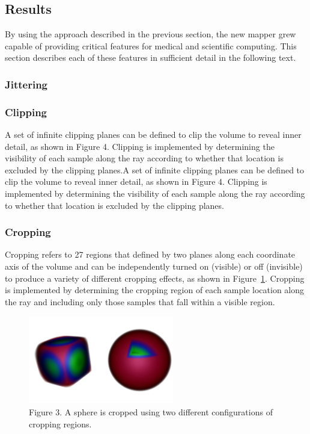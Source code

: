 \subsection{Results}
By using the approach described in the previous section, the new mapper grew capable of providing critical features for medical and scientific computing. This section describes each of these features in sufficient detail in the following text.

\subsubsection{Jittering}

\subsubsection{Clipping}
A set of infinite clipping planes can be defined to clip the volume to reveal inner detail, as shown in Figure 4.  Clipping is implemented by determining the visibility of each sample along the ray according to whether that location is excluded by the clipping planes.A set of infinite clipping planes can be defined to clip the volume to reveal inner detail, as shown in Figure 4.  Clipping is implemented by determining the visibility of each sample along the ray according to whether that location is excluded by the clipping planes.

\subsubsection{Cropping}
Cropping refers to 27 regions that defined by two planes along each coordinate axis of the volume and can be independently turned on (visible) or off (invisible) to produce a variety of different cropping effects, as shown in Figure~\ref{fig:cropping}. Cropping is implemented by determining the cropping region of each sample location along the ray and including only those samples that fall within a visible region.

\begin{figure}
\centering
\includegraphics[width=2.5in]{SphereCropping.png}
\caption{Figure 3. A sphere is cropped using two different configurations of cropping regions.}
\label{fig:cropping}
\end{figure}

